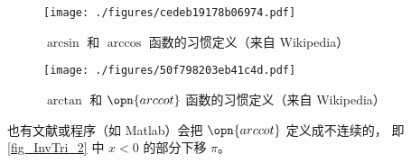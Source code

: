 
\begin{issues}
\issueDraft
\end{issues}

\begin{figure}[ht]
\centering
\texttt{[image: ./figures/cedeb19178b06974.pdf]}
\caption{$\arcsin$ 和 $\arccos$ 函数的习惯定义（来自 Wikipedia）} \label{fig_InvTri_1}
\end{figure}

\begin{figure}[ht]
\centering
\texttt{[image: ./figures/50f798203eb41c4d.pdf]}
\caption{$\arctan$ 和 $\opn{arccot}$ 函数的习惯定义（来自 Wikipedia）} \label{fig_InvTri_2}
\end{figure}

也有文献或程序（如 Matlab）会把 $\opn{arccot}$ 定义成不连续的， 即\autoref{fig_InvTri_2} 中 $x<0$ 的部分下移 $\pi$。
